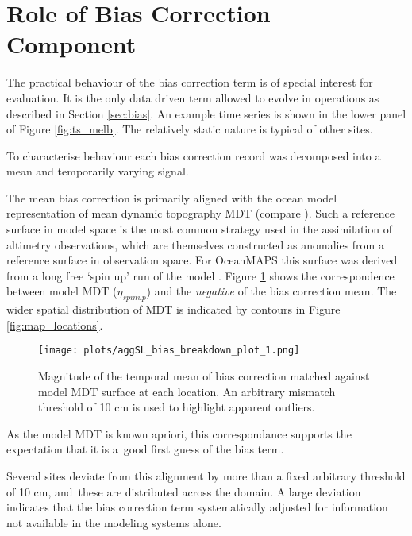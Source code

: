 \documentclass[jmse,article,accept,moreauthors,pdftex,10pt,a4paper]{mdpi}
\begin{document}
\section{Role of Bias Correction Component}
\label{sec:bias_more}

The practical behaviour of the bias correction term is of special interest for evaluation.   
It is the only data driven term allowed to evolve in operations as described in Section \ref{sec:bias}.
An example time series is shown in the lower panel of Figure \ref{fig:ts_melb}.
The relatively static nature is typical of other sites.


To characterise behaviour each bias correction record was decomposed into a mean and temporarily varying signal.

The mean bias correction is primarily aligned with the ocean model representation of mean dynamic topography MDT (compare \cite{Slobbe:wk}).
Such a reference surface in model space is the most common strategy used in the assimilation of altimetry observations, which are themselves constructed as anomalies from a reference surface in observation space. For OceanMAPS this surface was derived from a long free `spin up' run of the model \cite{Oke:2013fm}. 
Figure \ref{fig:bias_mean} shows the correspondence between model MDT ($\eta_{spinup}$) and the \textit{negative} of the bias correction mean.   The wider spatial distribution of MDT is indicated by contours in Figure \ref{fig:map_locations}.

\begin{figure}[H]
\centering
\texttt{[image: plots/aggSL\_bias\_breakdown\_plot\_1.png]}
\caption{ Magnitude of the temporal mean of bias correction matched against model MDT surface at each location. An arbitrary mismatch threshold of 10 cm is used to highlight apparent outliers.}\vspace{-6pt}
\label{fig:bias_mean}
\end{figure}   

As the model MDT is known apriori, this correspondance supports the expectation that it is a~good first guess of the bias term.

Several sites deviate from this alignment by more than a fixed arbitrary threshold of 10 cm, and~these are distributed across the domain.
A large deviation indicates that the bias correction term systematically adjusted for information not available in the modeling systems alone.  
\end{document}
